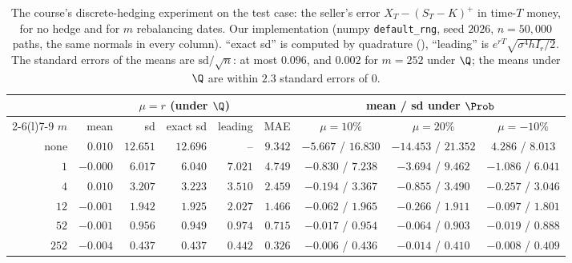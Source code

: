 \begin{table}[ht]
  \centering
  \small
  \setlength{\tabcolsep}{4.5pt}
  \begin{tabular}{@{}rrrrrrccc@{}}
    \toprule
    & \multicolumn{5}{c}{$\mu=r$ (under $\Q$)} & \multicolumn{3}{c}{mean / sd under $\Prob$}\\
    \cmidrule(lr){2-6}\cmidrule(l){7-9}
    $m$ & mean & sd & exact sd & leading & MAE & $\mu=10\%$ & $\mu=20\%$ & $\mu=-10\%$\\
    \midrule
    none & $0.010$ & $12.651$ & $12.696$ & -- & $9.342$ & $-5.667$ / $16.830$ & $-14.453$ / $21.352$ & $4.286$ / $8.013$\\
    $1$ & $-0.000$ & $6.017$ & $6.040$ & $7.021$ & $4.749$ & $-0.830$ / $7.238$ & $-3.694$ / $9.462$ & $-1.086$ / $6.041$\\
    $4$ & $0.010$ & $3.207$ & $3.223$ & $3.510$ & $2.459$ & $-0.194$ / $3.367$ & $-0.855$ / $3.490$ & $-0.257$ / $3.046$\\
    $12$ & $-0.001$ & $1.942$ & $1.925$ & $2.027$ & $1.466$ & $-0.062$ / $1.965$ & $-0.266$ / $1.911$ & $-0.097$ / $1.801$\\
    $52$ & $-0.001$ & $0.956$ & $0.949$ & $0.974$ & $0.715$ & $-0.017$ / $0.954$ & $-0.064$ / $0.903$ & $-0.019$ / $0.888$\\
    $252$ & $-0.004$ & $0.437$ & $0.437$ & $0.442$ & $0.326$ & $-0.006$ / $0.436$ & $-0.014$ / $0.410$ & $-0.008$ / $0.409$\\
    \bottomrule
  \end{tabular}
  \caption{The course's discrete-hedging experiment on the test case: the seller's error
    $X_T-(S_T-K)^+$ in time-$T$ money, for no hedge and for $m$ rebalancing dates. Our
    implementation (numpy \texttt{default\_rng}, seed $2026$, $n=50{,}000$ paths, the same
    normals in every column). ``exact sd'' is computed by quadrature (),
    ``leading'' is $e^{rT}\sqrt{\sigma^4hI_r/2}$. The standard errors of the means are
    $\text{sd}/\sqrt n$: at most $0.096$, and $0.002$ for $m=252$ under $\Q$; the means under $\Q$ are
    within $2.3$ standard errors of $0$.}
  \label{tab:hd-hw5}
\end{table}

